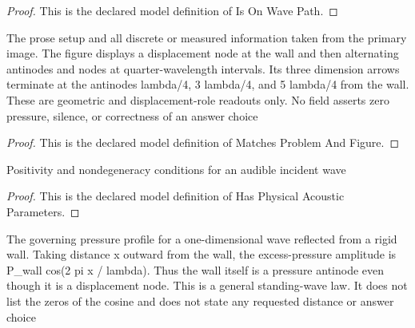 \begin{proof}
  This is the declared model definition of Is On Wave Path.
\end{proof}
\begin{definition}
  \label{def:physics:phyx-mini-0192:phyxminiproblems-problemphyxmini0192-matchesproblemandfigure}
  The prose setup and all discrete or measured information taken from the primary image. The figure displays a displacement node at the wall and then alternating antinodes and nodes at quarter-wavelength intervals. Its three dimension arrows terminate at the antinodes lambda/4, 3 lambda/4, and 5 lambda/4 from the wall. These are geometric and displacement-role readouts only. No field asserts zero pressure, silence, or correctness of an answer choice
\end{definition}
\begin{proof}
  This is the declared model definition of Matches Problem And Figure.
\end{proof}
\begin{definition}
  \label{def:physics:phyx-mini-0192:phyxminiproblems-problemphyxmini0192-hasphysicalacousticparameters}
  Positivity and nondegeneracy conditions for an audible incident wave
\end{definition}
\begin{proof}
  This is the declared model definition of Has Physical Acoustic Parameters.
\end{proof}
\begin{definition}
  \label{def:physics:phyx-mini-0192:phyxminiproblems-problemphyxmini0192-satisfiesrigidwallstandingwavepressurelaw}
  The governing pressure profile for a one-dimensional wave reflected from a rigid wall. Taking distance x outward from the wall, the excess-pressure amplitude is P\_wall cos(2 pi x / lambda). Thus the wall itself is a pressure antinode even though it is a displacement node. This is a general standing-wave law. It does not list the zeros of the cosine and does not state any requested distance or answer choice
\end{definition}

